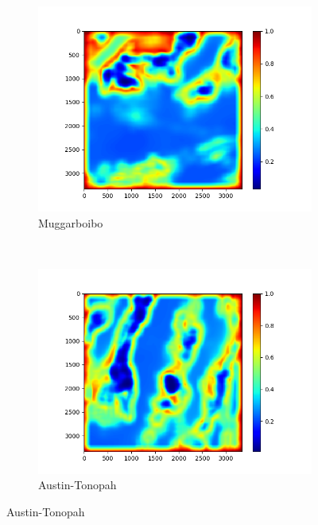 \documentclass[11pt,a4paper]{article}
\begin{document}
\begin{figure}[t]
    \begin{subfigure}[b]{0.45\textwidth}
        \includegraphics[width=\textwidth]{graphics/training/train_on_6_features_01234/heatmaps_faults_2.png}
        \caption{Muggarboibo}
        \label{fig:heatmaps_3_Muggarboibo}
    \end{subfigure}
    ~
    \begin{subfigure}[b]{0.45\textwidth}
        \includegraphics[width=\textwidth]{graphics/training/train_on_6_features_01234/heatmaps_faults_3.png}
        \caption{Austin-Tonopah}
        \label{fig:heatmaps_3_Austin-Tonopah}
    \end{subfigure}


\end{figure}
\end{document}
